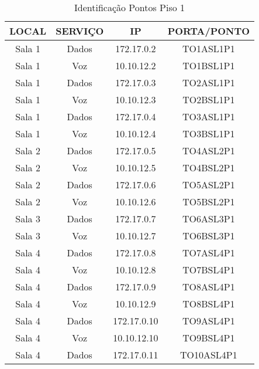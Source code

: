 \begin{table}[]
	\centering
	\caption{Identificação Pontos Piso 1}
	\label{pontos_p1}
	\begin{tabular}{cccc}
		\hline
		\textbf{LOCAL}  & \textbf{SERVIÇO} & \textbf{IP} & \textbf{PORTA/PONTO} \\ \hline
		Sala 1          & Dados            & 172.17.0.2  & TO1ASL1P1            \\ \hline
		Sala 1          & Voz              & 10.10.12.2  & TO1BSL1P1            \\ \hline
		Sala 1          & Dados            & 172.17.0.3  & TO2ASL1P1            \\ \hline
		Sala 1          & Voz              & 10.10.12.3  & TO2BSL1P1            \\ \hline
		Sala 1          & Dados            & 172.17.0.4  & TO3ASL1P1            \\ \hline
		Sala 1          & Voz              & 10.10.12.4  & TO3BSL1P1            \\ \hline
		Sala 2          & Dados            & 172.17.0.5  & TO4ASL2P1            \\ \hline
		Sala 2          & Voz              & 10.10.12.5  & TO4BSL2P1            \\ \hline
		Sala 2          & Dados            & 172.17.0.6  & TO5ASL2P1            \\ \hline
		Sala 2          & Voz              & 10.10.12.6  & TO5BSL2P1            \\ \hline
		Sala 3          & Dados            & 172.17.0.7  & TO6ASL3P1            \\ \hline
		Sala 3          & Voz              & 10.10.12.7  & TO6BSL3P1            \\ \hline
		Sala 4          & Dados            & 172.17.0.8  & TO7ASL4P1            \\ \hline
		Sala 4          & Voz              & 10.10.12.8  & TO7BSL4P1            \\ \hline
		Sala 4          & Dados            & 172.17.0.9  & TO8ASL4P1            \\ \hline
		Sala 4          & Voz              & 10.10.12.9  & TO8BSL4P1            \\ \hline
		Sala 4          & Dados            & 172.17.0.10 & TO9ASL4P1            \\ \hline
		Sala 4          & Voz              & 10.10.12.10 & TO9BSL4P1            \\ \hline
		Sala 4          & Dados            & 172.17.0.11 & TO10ASL4P1           \\ \hline

\end{tabular}
\end{table}
